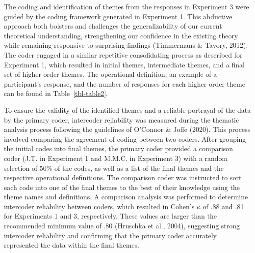 \documentclass[
  11pt,
  letterpaper,
]{article}
\begin{document}
The coding and identification of themes from the responses in Experiment
3 were guided by the coding framework generated in Experiment 1. This
abductive approach both bolsters and challenges the generalizability of
our current theoretical understanding, strengthening our confidence in
the existing theory while remaining responsive to surprising findings
(Timmermans \& Tavory, 2012). The coder engaged in a similar repetitive
consolidating process as described for Experiment 1, which resulted in
initial themes, intermediate themes, and a final set of higher order
themes. The operational definition, an example of a participant's
response, and the number of responses for each higher order theme can be
found in Table~\ref{tbl-table2}.

To ensure the validity of the identified themes and a reliable portrayal
of the data by the primary coder, intercoder reliability was measured
during the thematic analysis process following the guidelines of
O'Connor \& Joffe (2020). This process involved comparing the agreement
of coding between two coders. After grouping the initial codes into
final themes, the primary coder provided a comparison coder (J.T. in
Experiment 1 and M.M.C. in Experiment 3) with a random selection of 50\%
of the codes, as well as a list of the final themes and the respective
operational definitions. The comparison coder was instructed to sort
each code into one of the final themes to the best of their knowledge
using the theme names and definitions. A comparison analysis was
performed to determine intercoder reliability between coders, which
resulted in Cohen's \(\kappa\) of .88 and .81 for Experiments 1 and 3,
respectively. These values are larger than the recommended minimum value
of .80 (Hruschka et al., 2004), suggesting strong intercoder reliability
and confirming that the primary coder accurately represented the data
within the final themes.

\clearpage
\begingroup
{}
\end{document}
